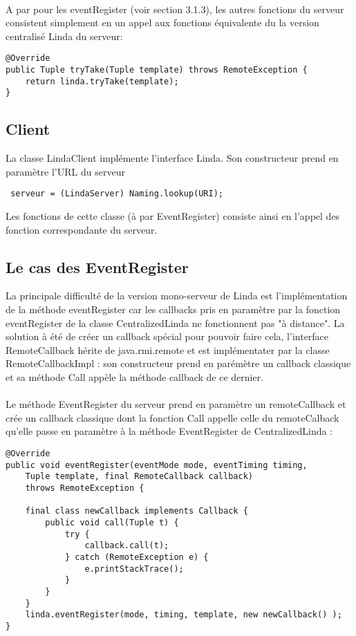 \documentclass{report}
\begin{document}
\paragraph{}A par pour les eventRegister (voir section 3.1.3), les autres fonctions du serveur consistent simplement en un appel aux fonctions équivalente du la version centralisé Linda du serveur:
\begin{lstlisting}
@Override
public Tuple tryTake(Tuple template) throws RemoteException {
	return linda.tryTake(template);
}
\end{lstlisting}
\subsection{Client}
La classe LindaClient implémente l'interface Linda.
Son constructeur prend en paramètre l'URL du serveur
\begin{lstlisting}
 serveur = (LindaServer) Naming.lookup(URI);
\end{lstlisting}
Les fonctions de cette classe (à par EventRegister) consiste ainsi en l'appel des fonction correspondante du serveur.
\subsection{Le cas des EventRegister}
La principale difficulté de la version mono-serveur de Linda est l'implémentation de la méthode eventRegister car les callbacks pris en paramètre par la fonction eventRegister de la classe CentralizedLinda ne fonctionnent pas "à distance".
La solution à été de créer un callback spécial pour pouvoir faire cela, l'interface RemoteCallback hérite de java.rmi.remote et est implémentater par la classe RemoteCallbackImpl : son constructeur prend en parémètre un callback classique et sa méthode Call appèle la méthode callback de ce dernier.
\paragraph{}Le méthode EventRegister du serveur prend en paramètre un remoteCallback et crée un callback classique dont la fonction Call appelle celle du remoteCalback qu'elle passe en paramètre à la méthode EventRegister de CentralizedLinda : 
\begin{lstlisting}
@Override
public void eventRegister(eventMode mode, eventTiming timing,
	Tuple template, final RemoteCallback callback) 
	throws RemoteException {
	
	final class newCallback implements Callback {
		public void call(Tuple t) {
			try {
				callback.call(t);
			} catch (RemoteException e) {
				e.printStackTrace();
			}
		}
	}	
	linda.eventRegister(mode, timing, template, new newCallback() );
}
\end{lstlisting}
\end{document}
